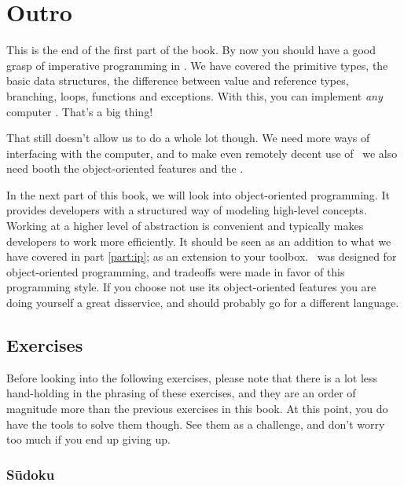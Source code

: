 \chapter{Outro}

This is the end of the first part of the book. By now you should have a good grasp of imperative programming in \csharp. We have covered the primitive types, the basic data structures, the difference between value and reference types, branching, loops, functions and exceptions. With this, you can implement \textsl{any} computer . That's a big thing!

That still doesn't allow us to do a whole lot though. We need more ways of interfacing with the computer, and to make even remotely decent use of \csharp\ we also need booth the object-oriented features and the .

In the next part of this book, we will look into object-oriented programming. It provides developers with a structured way of modeling high-level concepts. Working at a higher level of abstraction is convenient and typically makes developers to work more efficiently. It should be seen as an addition to what we have covered in part \ref{part:ip}; as an extension to your toolbox. \csharp\ was designed for object-oriented programming, and tradeoffs were made in favor of this programming style. If you choose not use its object-oriented features you are doing yourself a great disservice, and should probably go for a different language.

\section{Exercises}

Before looking into the following exercises, please note that there is a lot less hand-holding in the phrasing of these exercises, and they are an order of magnitude more  than the previous exercises in this book. At this point, you do have the tools to solve them though. See them as a challenge, and don't worry too much if you end up giving up.

\subsection{Sūdoku}

